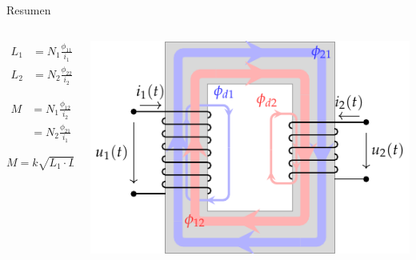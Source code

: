 \documentclass[aspectratio=169, usenames,svgnames,dvipsnames]{beamer}
\begin{document}
\begin{frame}[label={sec:orgc947c56}]{Resumen}
\begin{columns}
\begin{column}{0.4\columnwidth}
\begin{align*}
  L_1 &= N_1 \frac{\phi_{11}}{i_1}\\
  L_2 &= N_2 \frac{\phi_{22}}{i_2}
\end{align*}

\begin{align*}
  M &= N_1 \frac{\phi_{12}}{i_2}\\
    &= N_2 \frac{\phi_{21}}{i_1}
\end{align*}

\[
  M = k \sqrt{L_1 \cdot L_2}
\]
\end{column}

\begin{column}{0.6\columnwidth}
\begin{center}
\includegraphics[height=0.7\textheight]{../figs/acoplamientoTikz.pdf}
\end{center}
\end{column}
\end{columns}
\end{frame}
\end{document}
